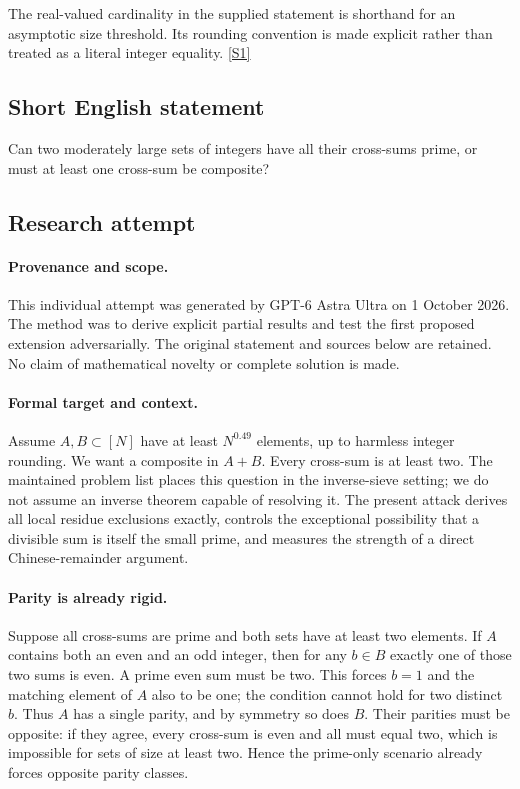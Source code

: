 \documentclass[11pt,a4paper]{article}
\newcommand{\sref}[2]{\hyperlink{source:#1:#2}{[S#2]}}
\begin{document}
The real-valued cardinality in the supplied statement is shorthand for an asymptotic size threshold. Its rounding convention is made explicit rather than treated as a literal integer equality. \sref{statement}{1}

\subsection{Short English statement}

Can two moderately large sets of integers have all their cross-sums prime, or must at least one cross-sum be composite?

\subsection{Research attempt}

\paragraph{Provenance and scope.}
This individual attempt was generated by GPT-6 Astra Ultra on 1 October 2026. The method was to derive explicit partial results and test the first proposed extension adversarially. The original statement and sources below are retained. No claim of mathematical novelty or complete solution is made.

\paragraph{Formal target and context.}
Assume $A,B\subset[N]$ have at least $N^{0.49}$ elements, up to harmless integer rounding. We want a composite in $A+B$. Every cross-sum is at least two. The maintained problem list places this question in the inverse-sieve setting; we do not assume an inverse theorem capable of resolving it. The present attack derives all local residue exclusions exactly, controls the exceptional possibility that a divisible sum is itself the small prime, and measures the strength of a direct Chinese-remainder argument.

\paragraph{Parity is already rigid.}
Suppose all cross-sums are prime and both sets have at least two elements. If $A$ contains both an even and an odd integer, then for any $b\in B$ exactly one of those two sums is even. A prime even sum must be two. This forces $b=1$ and the matching element of $A$ also to be one; the condition cannot hold for two distinct $b$. Thus $A$ has a single parity, and by symmetry so does $B$. Their parities must be opposite: if they agree, every cross-sum is even and all must equal two, which is impossible for sets of size at least two. Hence the prime-only scenario already forces opposite parity classes.
\end{document}
